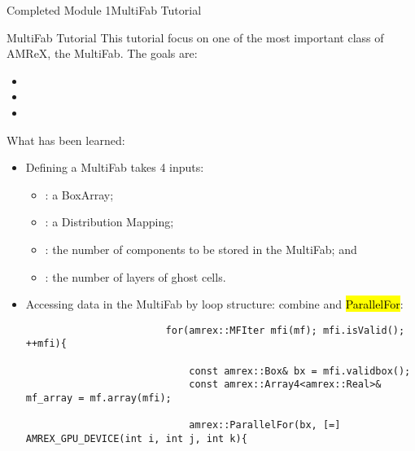 \documentclass[\string~/GitHub/sthlmNordBeamerTheme/sthlmNordLightDemo.tex]{subfiles}
\begin{document}
\begin{frame}{Completed Module 1}{MultiFab Tutorial}
    \begin{exampleblock}{MultiFab Tutorial}
        This tutorial focus on one of the most important class of AMReX, the MultiFab. The goals are:
            \begin{itemize}
                \item {}
                \item {}
                \item {}
            \end{itemize}
    \end{exampleblock}

    \remarks What has been learned:
        \begin{itemize}
		\item  Defining a MultiFab  takes 4 inputs: 
                \begin{itemize}
                    \item \texttt{}: a BoxArray;
                    \item \texttt{}: a Distribution Mapping;
                    \item \texttt{}: the number of components to be stored in the MultiFab; and
                    \item \texttt{}: the number of layers of ghost cells.
                \end{itemize}
		\item  Accessing data in the MultiFab by loop structure: combine  and \hl{ParallelFor}:
                \begin{center}
                    \begin{verbatim}
                        for(amrex::MFIter mfi(mf); mfi.isValid(); ++mfi){
                    
                            const amrex::Box& bx = mfi.validbox();
                            const amrex::Array4<amrex::Real>& mf_array = mf.array(mfi);

                            amrex::ParallelFor(bx, [=] AMREX_GPU_DEVICE(int i, int j, int k){


\end{verbatim}
\end{center}
\end{itemize}
\end{frame}
\end{document}

